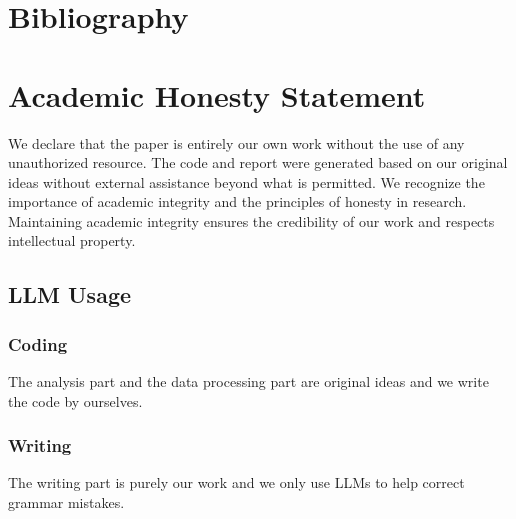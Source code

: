\documentclass[10pt,letterpaper]{article}
\begin{document}
\section{Bibliography}\label{bibliography}
\printbibliography

\section{Academic Honesty Statement}

We declare that the paper is entirely our own work without the use of any unauthorized resource. The code and report were generated based on our original ideas without external assistance beyond what is permitted. We recognize the importance of academic integrity and the principles of honesty in research. Maintaining academic integrity ensures the credibility of our work and respects intellectual property.

\subsection{LLM Usage}

\subsubsection*{Coding}

The analysis part and the data processing part are original ideas and we write the code by ourselves.

\subsubsection*{Writing}

The writing part is purely our work and we only use LLMs to help correct grammar mistakes.
\end{document}
